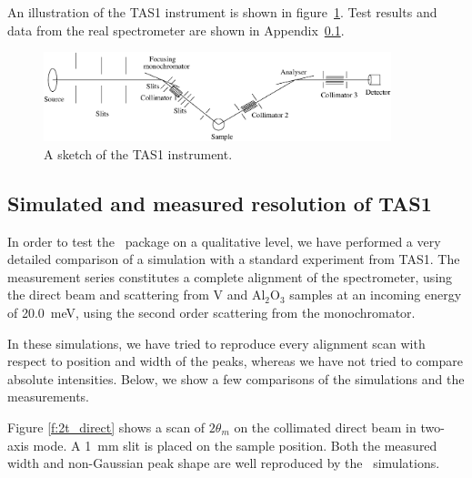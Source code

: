 An illustration of the TAS1 instrument
is shown in figure~\ref{f:TAS1}.
Test results and data from the real spectrometer are shown
in Appendix~\ref{data:TAS1}. 

\begin{figure}
  \begin{center}
    \includegraphics[width=0.9\textwidth]{figures/tas1.eps}
  \end{center}
\caption{A sketch of the TAS1 instrument.}
\label{f:TAS1}
\end{figure}

\subsection{Simulated and measured resolution of TAS1}
\label{data:TAS1}

In order to test the \MCS\ package on a qualitative level,
we have performed a very detailed comparison of a simulation with a
standard experiment from TAS1. The measurement series
constitutes a complete alignment of the spectrometer,
using the direct beam and scattering from V and Al$_2$O$_3$
samples at an incoming energy of 20.0~meV, using the second order
scattering from the monochromator. 

In these simulations, we have tried to reproduce
every alignment scan with respect to position and width
of the peaks, whereas we have not tried to compare
absolute intensities. Below, we show a few comparisons 
of the simulations and the measurements. 

Figure \ref{f:2t_direct} shows a scan of 
$2\theta_m$ on the collimated direct beam in two-axis mode.
A \hbox{1 mm} slit is placed on the sample position.
Both the measured width and non-Gaussian peak shape
are well reproduced by the \MCS\ simulations.

